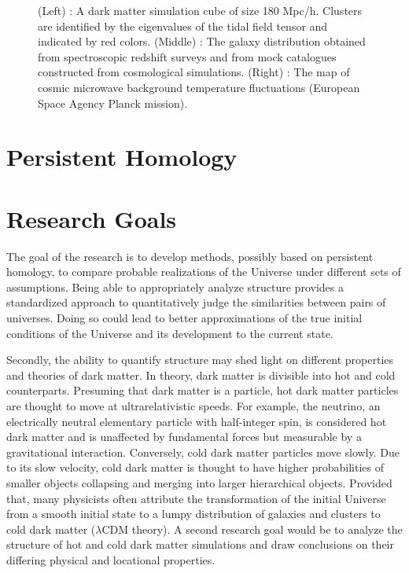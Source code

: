 \documentclass[12pt]{article}
\begin{document}
\begin{figure}[!htb]
\endminipage\hfill
\caption{(Left) : A dark matter simulation cube of size 180 Mpc/h. Clusters are identified by the eigenvalues of the tidal field tensor and indicated by red colors. (Middle) : The galaxy distribution obtained from spectroscopic redshift surveys and from mock catalogues constructed from cosmological simulations. (Right) : The map of cosmic microwave background temperature fluctuations (European Space Agency Planck mission). }
\end{figure}

\section{Persistent Homology}

\section{Research Goals}
The goal of the research is to develop methods, possibly based on persistent homology, to compare probable realizations of the Universe under different sets of assumptions. Being able to appropriately analyze structure provides a standardized approach to quantitatively judge the similarities between pairs of universes. Doing so could lead to better approximations of the true initial conditions of the Universe and its development to the current state. 

Secondly, the ability to quantify structure may shed light on different properties and theories of dark matter. In theory, dark matter is divisible into hot and cold counterparts. Presuming that dark matter is a particle, hot dark matter particles are thought to move at ultrarelativistic speeds. For example, the neutrino, an electrically neutral elementary particle with half-integer spin, is considered hot dark matter and is unaffected by fundamental forces but measurable by a gravitational interaction. Conversely, cold dark matter particles move slowly. Due to its slow velocity, cold dark matter is thought to have higher probabilities of smaller objects collapsing and merging into larger hierarchical objects. Provided that, many physicists often attribute the transformation of the initial Universe from a smooth initial state to a lumpy distribution of galaxies and clusters to cold dark matter ($\lambda$CDM theory). A second research goal would be to analyze the structure of hot and cold dark matter simulations and draw conclusions on their differing physical and locational properties. 
\end{document}
